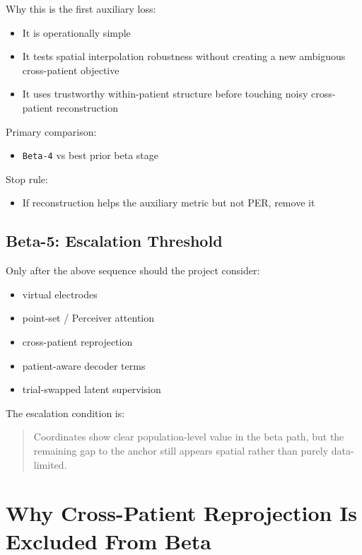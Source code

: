 \documentclass[
]{article}
\providecommand{\tightlist}{%
  \setlength{\itemsep}{0pt}\setlength{\parskip}{0pt}}
\begin{document}
Why this is the first auxiliary loss:

\begin{itemize}
\tightlist
\item
  It is operationally simple
\item
  It tests spatial interpolation robustness without creating a new
  ambiguous cross-patient objective
\item
  It uses trustworthy within-patient structure before touching noisy
  cross-patient reconstruction
\end{itemize}

Primary comparison:

\begin{itemize}
\tightlist
\item
  \texttt{Beta-4} vs best prior beta stage
\end{itemize}

Stop rule:

\begin{itemize}
\tightlist
\item
  If reconstruction helps the auxiliary metric but not PER, remove it
\end{itemize}

\subsection{Beta-5: Escalation
Threshold}\label{beta-5-escalation-threshold}

Only after the above sequence should the project consider:

\begin{itemize}
\tightlist
\item
  virtual electrodes
\item
  point-set / Perceiver attention
\item
  cross-patient reprojection
\item
  patient-aware decoder terms
\item
  trial-swapped latent supervision
\end{itemize}

The escalation condition is:

\begin{quote}
Coordinates show clear population-level value in the beta path, but the
remaining gap to the anchor still appears spatial rather than purely
data-limited.
\end{quote}

\section{Why Cross-Patient Reprojection Is Excluded From
Beta}\label{why-cross-patient-reprojection-is-excluded-from-beta}
\end{document}
